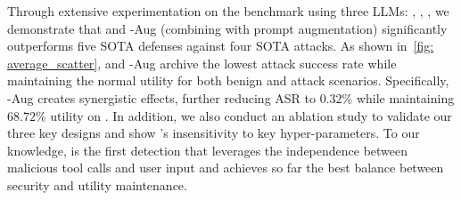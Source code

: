Through extensive experimentation on the \dojo benchmark using three LLMs: \gpt, \othree, \llama, we demonstrate that \method and \method-Aug (combining \method with prompt augmentation) significantly outperforms five SOTA defenses against four SOTA attacks.
As shown in~\cref{fig: average_scatter}, \method and \method-Aug archive the lowest attack success rate while maintaining the normal utility for both benign and attack scenarios.
Specifically, \method-Aug creates synergistic effects, further reducing ASR to $0.32$\% while maintaining $68.72$\% utility on \gpt. 
In addition, we also conduct an ablation study to validate our three key designs and show \method's insensitivity to key hyper-parameters.
To our knowledge, \method is the first \ipi detection that leverages the independence between malicious tool calls and user input and achieves so far the best balance between security and utility maintenance.







    
    
    

